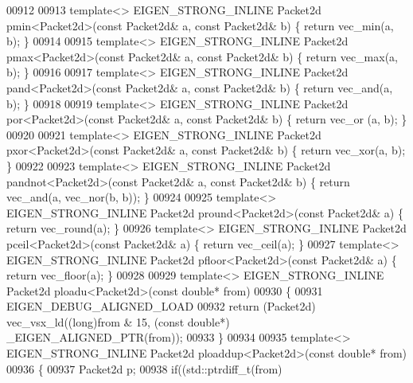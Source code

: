 \begin{DoxyCode}
{00912 
00913 \textcolor{keyword}{template}<> EIGEN\_STRONG\_INLINE Packet2d pmin<Packet2d>(\textcolor{keyword}{const} Packet2d& a, \textcolor{keyword}{const} Packet2d& b) \{ \textcolor{keywordflow}{return} 
      vec\_min(a, b); \}
00914 
00915 \textcolor{keyword}{template}<> EIGEN\_STRONG\_INLINE Packet2d pmax<Packet2d>(\textcolor{keyword}{const} Packet2d& a, \textcolor{keyword}{const} Packet2d& b) \{ \textcolor{keywordflow}{return} 
      vec\_max(a, b); \}
00916 
00917 \textcolor{keyword}{template}<> EIGEN\_STRONG\_INLINE Packet2d pand<Packet2d>(\textcolor{keyword}{const} Packet2d& a, \textcolor{keyword}{const} Packet2d& b) \{ \textcolor{keywordflow}{return} 
      vec\_and(a, b); \}
00918 
00919 \textcolor{keyword}{template}<> EIGEN\_STRONG\_INLINE Packet2d por<Packet2d>(\textcolor{keyword}{const} Packet2d& a, \textcolor{keyword}{const} Packet2d& b) \{ \textcolor{keywordflow}{return} vec\_or
      (a, b); \}
00920 
00921 \textcolor{keyword}{template}<> EIGEN\_STRONG\_INLINE Packet2d pxor<Packet2d>(\textcolor{keyword}{const} Packet2d& a, \textcolor{keyword}{const} Packet2d& b) \{ \textcolor{keywordflow}{return} 
      vec\_xor(a, b); \}
00922 
00923 \textcolor{keyword}{template}<> EIGEN\_STRONG\_INLINE Packet2d pandnot<Packet2d>(\textcolor{keyword}{const} Packet2d& a, \textcolor{keyword}{const} Packet2d& b) \{ \textcolor{keywordflow}{return} 
      vec\_and(a, vec\_nor(b, b)); \}
00924 
00925 \textcolor{keyword}{template}<> EIGEN\_STRONG\_INLINE Packet2d pround<Packet2d>(\textcolor{keyword}{const} Packet2d& a) \{ \textcolor{keywordflow}{return} vec\_round(a); \}
00926 \textcolor{keyword}{template}<> EIGEN\_STRONG\_INLINE Packet2d pceil<Packet2d>(\textcolor{keyword}{const}  Packet2d& a) \{ \textcolor{keywordflow}{return} vec\_ceil(a); \}
00927 \textcolor{keyword}{template}<> EIGEN\_STRONG\_INLINE Packet2d pfloor<Packet2d>(\textcolor{keyword}{const} Packet2d& a) \{ \textcolor{keywordflow}{return} vec\_floor(a); \}
00928 
00929 \textcolor{keyword}{template}<> EIGEN\_STRONG\_INLINE Packet2d ploadu<Packet2d>(\textcolor{keyword}{const} \textcolor{keywordtype}{double}* from)
00930 \{
00931   EIGEN\_DEBUG\_ALIGNED\_LOAD
00932   \textcolor{keywordflow}{return} (Packet2d) vec\_vsx\_ld((\textcolor{keywordtype}{long})from & 15, (\textcolor{keyword}{const} \textcolor{keywordtype}{double}*) \_EIGEN\_ALIGNED\_PTR(from));
00933 \}
00934 
00935 \textcolor{keyword}{template}<> EIGEN\_STRONG\_INLINE Packet2d ploaddup<Packet2d>(\textcolor{keyword}{const} \textcolor{keywordtype}{double}*   from)
00936 \{
00937   Packet2d p;
00938   \textcolor{keywordflow}{if}((std::ptrdiff\_t(from) %
}
\end{DoxyCode}
